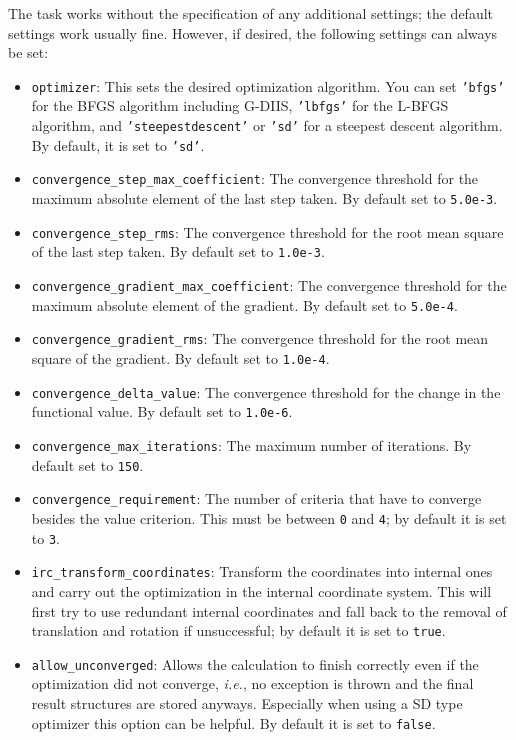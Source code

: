 \documentclass[]{tufte-book}
\begin{document}
The task works without the specification of any additional settings; the default settings work usually fine. However,
if desired, the following settings can always be set:
\begin{itemize}
\item \texttt{optimizer}: This sets the desired optimization algorithm. You can set \texttt{'bfgs'} for the BFGS algorithm including
G-DIIS, \texttt{'lbfgs'} for the L-BFGS algorithm, and
\texttt{'steepestdescent'} or \texttt{'sd'} for a steepest descent algorithm. By default, it is set to \texttt{'sd'}.
\item \texttt{convergence\_step\_max\_coefficient}: The convergence threshold for the maximum absolute element of the last step taken.
By default set to \texttt{5.0e-3}.
\item \texttt{convergence\_step\_rms}: The convergence threshold for the root mean square of the last step taken. By default set to 
\texttt{1.0e-3}.
\item \texttt{convergence\_gradient\_max\_coefficient}: The convergence threshold for the maximum absolute element of the gradient. 
By default set to \texttt{5.0e-4}.
\item \texttt{convergence\_gradient\_rms}: The convergence threshold for the root mean square of the gradient. By default set to 
\texttt{1.0e-4}.
\item \texttt{convergence\_delta\_value}: The convergence threshold for the change in the functional value. By default set to
\texttt{1.0e-6}.
\item \texttt{convergence\_max\_iterations}: The maximum number of iterations. By default set to \texttt{150}.
\item \texttt{convergence\_requirement}: The number of criteria that have to converge besides the value criterion. This 
must be between \texttt{0} and \texttt{4}; by default it is set to \texttt{3}.
\item \texttt{irc\_transform\_coordinates}: Transform the coordinates into internal ones and carry out the optimization
in the internal coordinate system. This will first try to use redundant internal coordinates\cite{libirc} and fall back to the removal
of translation and rotation if unsuccessful; by default it is set to \texttt{true}.
\item \texttt{allow\_unconverged}: Allows the calculation to finish correctly even if the optimization did not 
converge, \textit{i.e.}, no exception is thrown and the final result structures are stored anyways. Especially 
when using a SD type optimizer this option can be helpful. By default it is set to \texttt{false}.
\end{itemize}
\end{document}

